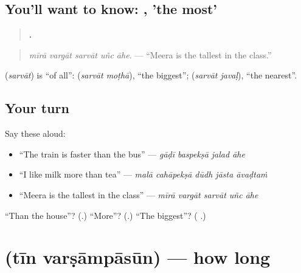 \subsection*{You'll want to know: , 'the most'}
\begin{quote}
\textbf{    .}
\end{quote}

\begin{quote}
\emph{mīrā vargāt sarvāt uñc āhe.} — \textquotedblleft{}Meera is the tallest in the class.\textquotedblright{}
\end{quote}

\textbf{} (\emph{sarvāt}) is \textquotedblleft{}of all\textquotedblright{}: \textbf{ } (\emph{sarvāt moṭhā}), \textquotedblleft{}the biggest\textquotedblright{}; \textbf{ } (\emph{sarvāt javaḷ}), \textquotedblleft{}the nearest\textquotedblright{}.

\subsection*{Your turn}
Say these aloud:

\begin{itemize}
\raggedright
  \item \textquotedblleft{}The train is faster than the bus\textquotedblright{} — \emph{gāḍī baspekṣā jalad āhe}
  \item \textquotedblleft{}I like milk more than tea\textquotedblright{} — \emph{malā cahāpekṣā dūdh jāsta āvaḍtaṁ}
  \item \textquotedblleft{}Meera is the tallest in the class\textquotedblright{} — \emph{mīrā vargāt sarvāt uñc āhe}
\end{itemize}

\begin{tcolorbox}[breakable,colback=teal!4,colframe=teal!35!black,title={Before you move on}]
\textquotedblleft{}Than the house\textquotedblright{}? (\textbf{}.) \textquotedblleft{}More\textquotedblright{}? (\textbf{}.) \textquotedblleft{}The biggest\textquotedblright{}? (\textbf{ }.)
\end{tcolorbox}
\section[\texorpdfstring{\mr{तीन} \mr{वर्षांपासून} (tīn varṣāmpāsūn)}{तीन वर्षांपासून (tīn varṣāmpāsūn)}]{  (tīn varṣāmpāsūn) — how long}


